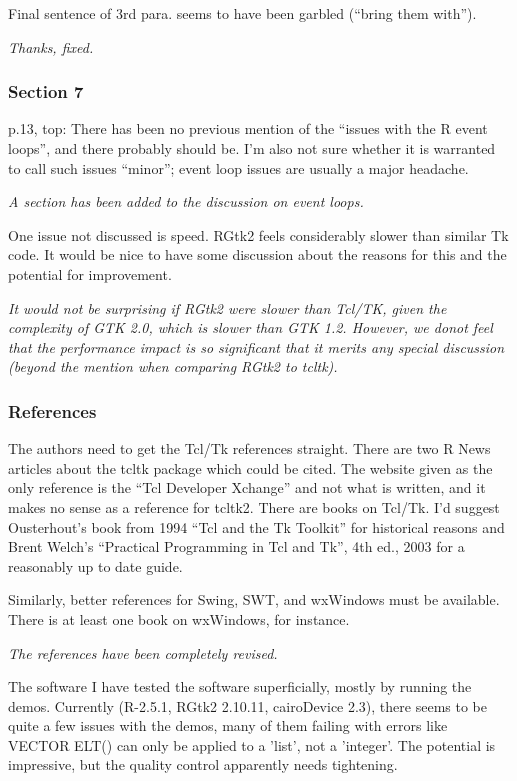 \documentclass{article}
\begin{document}
Final sentence of 3rd para. seems to have been garbled (``bring them with'').

\emph{Thanks, fixed.}

\subsubsection*{Section 7}

p.13, top: There has been no previous mention of the ``issues with the R event
loops'', and there probably should be. I'm also not sure whether it is warranted
to call such issues ``minor''; event loop issues are usually a major headache.

\emph{A section has been added to the discussion on event loops.}

One issue not discussed is speed. RGtk2 feels considerably slower than similar
Tk code. It would be nice to have some discussion about the reasons for this
and the potential for improvement.

\emph{It would not be surprising if RGtk2 were slower than Tcl/TK, given the complexity of GTK 2.0, which is slower than GTK 1.2. However, we donot feel that the performance impact is so significant that it merits any special discussion (beyond the mention when comparing RGtk2 to tcltk).
}

\subsubsection*{References}

The authors need to get the Tcl/Tk references straight. There are two R News
articles about the tcltk package which could be cited. The website given as the
only reference is the ``Tcl Developer Xchange'' and not what is written, and it
makes no sense as a reference for tcltk2.
There are books on Tcl/Tk. I'd suggest Ousterhout's book from 1994 ``Tcl and
the Tk Toolkit'' for historical reasons and Brent Welch's ``Practical Programming
in Tcl and Tk'', 4th ed., 2003 for a reasonably up to date guide.

Similarly, better references for Swing, SWT, and wxWindows must be available.
There is at least one book on wxWindows, for instance.

\emph{The references have been completely revised.}

The software
I have tested the software superficially, mostly by running the demos. Currently
(R-2.5.1, RGtk2 2.10.11, cairoDevice 2.3), there seems to be quite a few
issues with the demos, many of them failing with errors like VECTOR ELT()
can only be applied to a 'list', not a 'integer'. The potential is impressive,
but the quality control apparently needs tightening. 
\end{document}
